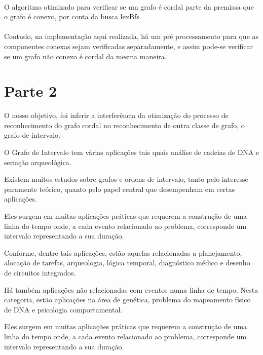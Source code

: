 \documentclass[a4paper, 11pt]{article}
\begin{document}
						\paragraph{}O algoritmo otimizado para verificar se um grafo é cordal parte da premissa que o grafo é conexo, por conta da busca lexBfs.
						
						\paragraph{}Contudo, na implementação aqui realizada, há um pré processamento para que as componentes conexas sejam verificadas separadamente, e assim pode-se verificar se um grafo não conexo é cordal da mesma maneira.
						
						
			
		\section{Parte 2}
			O nosso objetivo, foi inferir a interferência da otimização do processo de reconhecimento do grafo cordal no reconhecimento de outra classe de grafo, o grafo de intervalo.
						
			O Grafo de Intervalo tem várias aplicações tais quais análise de cadeias de DNA e seriação arqueológica.
			
			Existem  muitos  estudos  sobre  grafos  e  ordens  de  intervalo,   tanto  pelo  interesse  puramente  teórico,  quanto  pelo  papel  central  que  desempenham  em  certas aplicações.
			
			 Eles surgem em muitas aplicações práticas que requerem a construção de uma linha do tempo onde, a cada evento relacionado ao problema, corresponde um intervalo representando a sua duração.
			 
			 Conforme, dentre tais aplicações, estão aquelas relacionadas a planejamento,  alocação de tarefas,  arqueologia,  lógica temporal,  diagnóstico médico  e desenho de circuitos integrados.
			 
			 Há também aplicações não relacionadas com eventos numa linha de tempo. Nesta categoria, estão aplicações na área de genética, problema do mapeamento físico de DNA e psicologia comportamental.
			\par Eles surgem em muitas aplicações práticas que requerem a construção de uma linha do tempo onde, a cada evento relacionado ao problema, corresponde um intervalo representando a sua duração.
			
\end{document}
